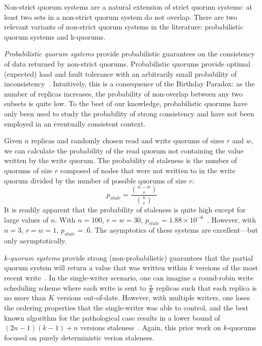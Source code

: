 \documentclass{vldb}
\begin{document}
Non-strict quorum systems are a natural extension of strict quorum
systems: at least two sets in a non-strict quorum system do not
overlap.  There are two relevant variants of non-strict quorum systems in
the literature: probabilistic quorum systems and k-quorums.

\textit{Probabilistic quorum systems} provide probabilistic guarantees
on the consistency of data returned by non-strict quorums.
Probabilistic quorums provide optimal (expected) load and fault
tolerance with an arbitrarily small probability of
inconsistency~\cite{prob-quorum}.  Intuitively, this is a consequence
of the Birthday Paradox: as the number of replicas increases, the
probability of non-overlap between any two subsets is quite low.  To
the best of our knowledge, probabilistic quorums have only been used
to study the probability of strong consistency and have not been
employed in an eventually consistent context.

Given $n$ replicas and randomly chosen read and write quorums of sizes
$r$ and $w$, we can calculate the probability of the read quorum not
containing the value written by the write quorum.  The probability of
staleness is the number of quorums of size $r$ composed of nodes that
were not written to in the write quorum divided by the number of
possible quorums of size $r$:
\begin{equation}
\label{eq:prob-strict}
p_{stale}=\frac{{n-w \choose r}}{{n \choose r}}
\end{equation}
It is readily apparent that the probability of staleness is quite high
except for large values of $n$.  With $n=100$, $r=w=30$, $p_{stale} =
1.88 \times 10^{-6}$~\cite{nonstrict-availability}.  However, with
$n=3$, $r=w=1$, $p_{stale} = .\overline{6}$.  The asymptotics of these
systems are excellent---but only asymptotically.  

\textit{$k$-quorum systems} provide strong (non-probabilistic)
guarantees that the partial quorum system will return a value that was
written within $k$ versions of the most recent
write~\cite{nonstrict-availability}.  In the single-writer scenario,
one can imagine a round-robin write scheduling scheme where each write
is sent to $\frac{n}{K}$ replicas such that each replica is no more
than $K$ versions out-of-date.  However, with multiple writers, one
loses the ordering properties that the single-writer was able to
control, and the best known algorithm for the pathological case
results in a lower bound of $(2n-1)(k-1)+n$ versions staleness~\cite{k-quorum-lb}.
Again, this prior work on $k$-quorums focused on purely deterministic
verion staleness.
\end{document}
